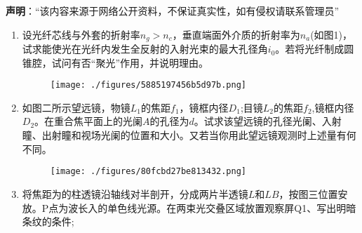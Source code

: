 
\textbf{声明}：“该内容来源于网络公开资料，不保证真实性，如有侵权请联系管理员”

\begin{enumerate}
\item 设光纤芯线与外套的折射率$n_g>n_c$，垂直端面外介质的折射率为$n_a$(如图1)，试求能使光在光纤内发生全反射的入射光束的最大孔径角$i_0$。若将光纤制成圆锥腔，试问有否“聚光”作用，并说明理由。
\begin{figure}[ht]
\centering
\texttt{[image: ./figures/5885197456b5d97b.png]}
\caption{} \label{fig_HGD00_1}
\end{figure}
\item 如图二所示望远镜，物镜$L_1$的焦距$f_1$，镜框内径$D_1$;目镜$L_2$的焦距$f_2$,镜框内径$D_2$。在重合焦平面上的光阑$A$的孔径为$d$。试求该望远镜的孔径光阑、入射瞳、出射瞳和视场光阑的位置和大小。又若当你用此望远镜观测时上述量有何不同。
\begin{figure}[ht]
\centering
\texttt{[image: ./figures/80fcbd27be813432.png]}
\caption{} \label{fig_HGD00_2}
\end{figure}
\item 将焦距为的柱透镜沿轴线对半剖开，分成两片半透镜$L$和$LB$，按图三位置安放。P点为波长入的单色线光源。在两束光交叠区域放置观察屏Q1、写出明暗条纹的条件;
\end{enumerate}